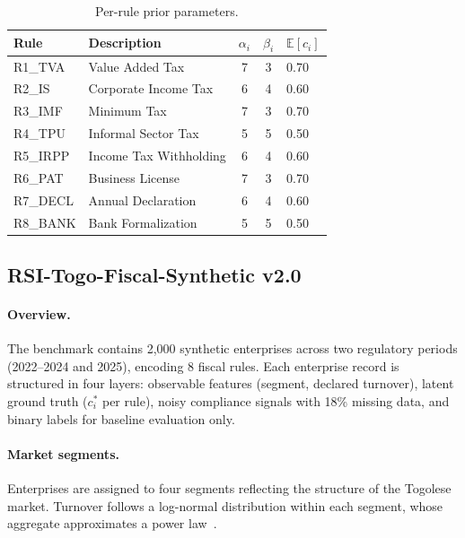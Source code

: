 \begin{table}[H]
\centering
\caption{Per-rule prior parameters.}
\label{tab:rule_priors}
\renewcommand{\arraystretch}{1.15}
\begin{tabular}{llccl}
\toprule
\textbf{Rule} & \textbf{Description} & $\alpha_i$ & $\beta_i$
  & $\mathbb{E}[c_i]$ \\
\midrule
R1\_TVA  & Value Added Tax          & 7 & 3 & 0.70 \\
R2\_IS   & Corporate Income Tax     & 6 & 4 & 0.60 \\
R3\_IMF  & Minimum Tax              & 7 & 3 & 0.70 \\
R4\_TPU  & Informal Sector Tax      & 5 & 5 & 0.50 \\
R5\_IRPP & Income Tax Withholding   & 6 & 4 & 0.60 \\
R6\_PAT  & Business License         & 7 & 3 & 0.70 \\
R7\_DECL & Annual Declaration       & 6 & 4 & 0.60 \\
R8\_BANK & Bank Formalization       & 5 & 5 & 0.50 \\
\bottomrule
\end{tabular}
\end{table}


\subsection{RSI-Togo-Fiscal-Synthetic v2.0}

\paragraph{Overview.}
The benchmark contains 2{,}000 synthetic enterprises across two
regulatory periods (2022--2024 and 2025), encoding 8 fiscal rules.
Each enterprise record is structured in four layers: observable
features (segment, declared turnover), latent ground truth
($c_i^*$ per rule), noisy compliance signals with 18\% missing data,
and binary labels for baseline evaluation only.

\paragraph{Market segments.}
Enterprises are assigned to four segments reflecting the structure
of the Togolese market. Turnover follows a log-normal distribution
within each segment, whose aggregate approximates a power
law~\citep{gabaix2009power}.

